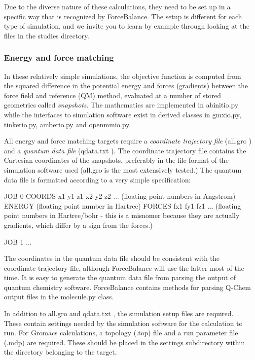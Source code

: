 Due to the diverse nature of these calculations, they need to be set up in a specific way that is recognized by Force\+Balance. The setup is different for each type of simulation, and we invite you to learn by example through looking at the files in the {\ttfamily studies} directory.\hypertarget{usage_energy_force_matching}{}\subsubsection{Energy and force matching}\label{usage_energy_force_matching}
In these relatively simple simulations, the objective function is computed from the squared difference in the potential energy and forces (gradients) between the force field and reference (QM) method, evaluated at a number of stored geometries called {\itshape snapshots}. The mathematics are implemented in {\ttfamily abinitio.\+py} while the interfaces to simulation software exist in derived classes in {\ttfamily gmxio.\+py}, {\ttfamily tinkerio.\+py}, {\ttfamily amberio.\+py} and {\ttfamily openmmio.\+py}.

All energy and force matching targets require a {\itshape coordinate trajectory file} ({\ttfamily all.\+gro} ) and a {\itshape  quantum data file } ({\ttfamily qdata.\+txt} ). The coordinate trajectory file contains the Cartesian coordinates of the snapshots, preferably in the file format of the simulation software used ({\ttfamily all.\+gro} is the most extensively tested.) The quantum data file is formatted according to a very simple specification\+:

\begin{DoxyVerb} JOB 0
 COORDS x1 y1 z1 x2 y2 z2 ... (floating point numbers in Angstrom)
 ENERGY (floating point number in Hartree)
 FORCES fx1 fy1 fz1 ... (floating point numbers in Hartree/bohr - this is a misnomer because they are actually gradients, which differ by a sign from the forces.)
 
 JOB 1
 ...\end{DoxyVerb}


The coordinates in the quantum data file should be consistent with the coordinate trajectory file, although Force\+Balance will use the latter most of the time. It is easy to generate the quantum data file from parsing the output of quantum chemistry software. Force\+Balance contains methods for parsing Q-\/\+Chem output files in the {\ttfamily molecule.\+py} class.

In addition to {\ttfamily all.\+gro} and {\ttfamily qdata.\+txt} , the simulation setup files are required. These contain settings needed by the simulation software for the calculation to run. For Gromacs calculations, a topology (.top) file and a run parameter file (.mdp) are required. These should be placed in the {\ttfamily settings} subdirectory within the directory belonging to the target.

